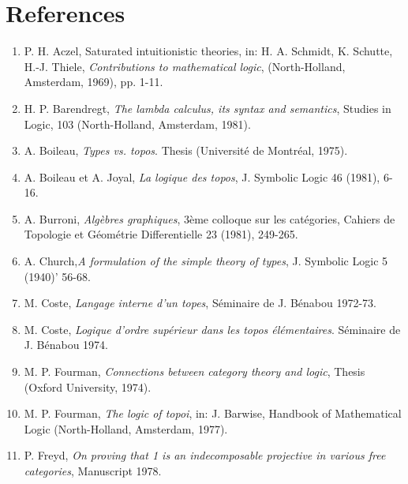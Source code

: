 \section*{References} 

\def\bb#1{\bibitem[#1]{#1}}

\begin{enumerate}[leftmargin=*, widest=8888, align=left]

\item[] P. H. Aczel, Saturated intuitionistic theories, in: H. A. Schmidt, K. Schutte,
H.-J. Thiele, {\em Contributions to mathematical logic}, (North-Holland,
Amsterdam, 1969), pp. 1-11.

\item[] H. P. Barendregt, {\em The lambda calculus, its syntax and semantics}, Studies in
Logic, 103 (North-Holland, Amsterdam, 1981).

\item[] A. Boileau, {\em Types vs. topos}. Thesis (Universit\'e de Montr\'eal, 1975).

\item[] A. Boileau et A. Joyal, {\em La logique des topos}, J. Symbolic Logic 46 (1981),
6-16.

\item[] A. Burroni, {\em Alg\`ebres graphiques}, 3\`eme colloque sur les cat\'egories, Cahiers de
Topologie et G\'eom\'etrie Differentielle 23 (1981), 249-265.

\item[] A. Church,{\em A formulation of the simple theory of types}, J. Symbolic Logic 5
(1940)' 56-68.

\item[] M. Coste, {\em Langage interne d'un topes}, S\'eminaire de J. B\'enabou 1972-73.

\item[] M. Coste, {\em Logique d'ordre sup\'erieur dans les topos \'el\'ementaires}. S\'eminaire
de J. B\'enabou 1974.

\item[]M. P. Fourman, {\em Connections between category theory and logic}, Thesis
(Oxford University, 1974).

\item[]M. P. Fourman, {\em The logic of topoi}, in: J. Barwise, Handbook of Mathematical
Logic (North-Holland, Amsterdam, 1977).

\item[] P. Freyd, {\em On proving that 1 is an indecomposable projective in various free
categories}, Manuscript 1978.


\end{enumerate}
